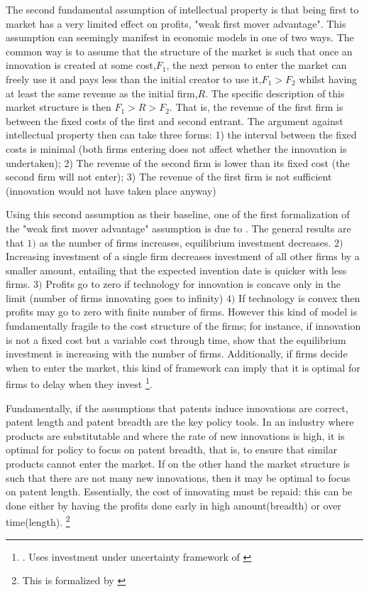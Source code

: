 \documentclass[12pt]{report}
\numberwithin{equation}{section}
\begin{document}
The second fundamental assumption of intellectual property is that being first to market has a very limited effect on profits, "weak first mover advantage". This assumption can seemingly manifest in economic models in one of two ways. The common way is to assume that the structure of the market is such that once an innovation is created at some cost,$F_1$, the next person to enter the market can freely use it and pays less than the initial creator to use it,$F_1>F_2$ whilst having at least the same revenue as the initial firm,$R$. The specific description of this market structure is then $F_1>R>F_2$. That is, the revenue of the first firm is between the fixed costs of the first and second entrant. The argument against intellectual property then can take three forms: 1) the interval between the fixed costs is minimal (both firms entering does not affect whether the innovation is undertaken); 2) The revenue of the second firm is lower than its fixed cost (the second firm will not enter); 3) The revenue of the first firm is not sufficient (innovation would not have taken place anyway)

Using this second assumption as their baseline, one of the first formalization of the "weak first mover advantage" assumption is due to \cite{loury_1979}. The general results are that $1)$ as the number of firms increases, equilibrium investment decreases. $2)$ Increasing investment of a single firm decreases investment of all other firms by a smaller amount, entailing that the expected invention date is quicker with less firms. $3)$ Profits go to zero if technology for innovation is concave only in the limit (number of firms innovating goes to infinity) $4)$ If technology is convex then profits may go to zero with finite number of firms. However this kind of model is fundamentally fragile to the cost structure of the firms; for instance, if innovation is not a fixed cost but a variable cost through time, \cite{lee1980market} show that the equilibrium investment is increasing with the number of firms. Additionally, if firms decide when to enter the market, this kind of framework can imply that it is optimal for firms to delay when they invest \footnote{\cite{Weeds2002}. Uses investment under uncertainty framework of \cite{dixit1994investment}}.

Fundamentally, if the assumptions that patents induce innovations are correct, patent length and patent breadth are the key policy tools. In an industry where products are substitutable and where the rate of new innovations is high, it is optimal for policy to focus on patent breadth, that is, to ensure that similar products cannot enter the market. If on the other hand the market structure is such that there are not many new innovations, then it may be optimal to focus on patent length. Essentially, the cost of innovating must be repaid: this can be done either by having the profits done early in high amount(breadth) or over time(length). \footnote{This is formalized by \cite{takalo2001optimal}}
\end{document}
